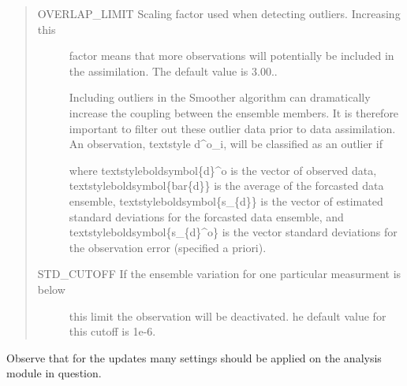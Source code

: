 \documentclass[letterpaper,10pt,english]{sphinxmanual}
\begin{document}
\begin{quote}
\begin{description}
\item[{OVERLAP\_LIMIT Scaling factor used when detecting outliers. Increasing this}] \leavevmode
factor means that more observations will potentially be included in the
assimilation. The default value is 3.00..

Including outliers in the Smoother algorithm can dramatically increase the
coupling between the ensemble members. It is therefore important to filter out
these outlier data prior to data assimilation. An observation, textstyle
d\textasciicircum{}o\_i, will be classified as an outlier if

%
\begin{sphinxVerbatim}[commandchars=\\\{\}]
  \PYGZbs{}  \PYGZbs{}\PYGZbs{} \PYGZbs{}  \PYGZbs{}\PYGZbs{}
\end{sphinxVerbatim}

where textstyleboldsymbol\{d\}\textasciicircum{}o is the vector of observed data,
textstyleboldsymbol\{bar\{d\}\} is the average of the forcasted data ensemble,
textstyleboldsymbol\{s\_\{d\}\} is the vector of estimated standard deviations
for the forcasted data ensemble, and textstyleboldsymbol\{s\_\{d\}\textasciicircum{}o\} is the
vector standard deviations for the observation error (specified a priori).

\item[{STD\_CUTOFF If the ensemble variation for one particular measurment is below}] \leavevmode
this limit the observation will be deactivated. he default value for
this cutoff is 1e-6.

\end{description}
\end{quote}

Observe that for the updates many settings should be applied on the analysis
module in question.
\end{document}
